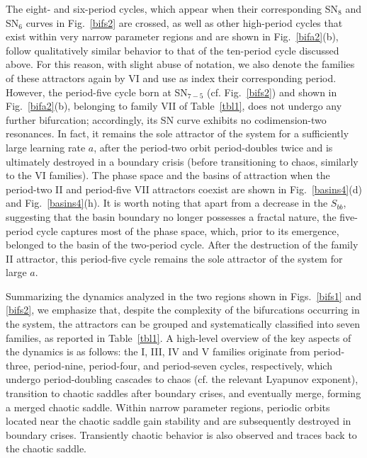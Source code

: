 \documentclass{article}
\theoremstyle{plain}
\theoremstyle{definition}
\begin{document}
The eight- and six-period cycles, which appear when their corresponding SN$_8$ and SN$_6$ curves in Fig.~\ref{bifs2} are crossed, as well as other high-period cycles that exist within very narrow parameter regions and are shown in Fig.~\ref{bifa2}(b), follow qualitatively similar behavior to that of the ten-period cycle discussed above. For this reason, with slight abuse of notation, we also denote the families of these attractors again by VI and use as index their corresponding period. However, the period-five cycle born at SN$_{7-5}$ (cf. Fig.~\ref{bifs2}) and shown in Fig.~\ref{bifa2}(b), belonging to family VII of Table~\ref{tbl1}, does not undergo any further bifurcation; accordingly, its SN curve exhibits no codimension-two resonances. In fact, it remains the sole attractor of the system for a sufficiently large learning rate $a$, after the period-two orbit period-doubles twice and is ultimately destroyed in a boundary crisis (before transitioning to chaos, similarly to the VI families). The phase space and the basins of attraction when the period-two II and period-five VII attractors coexist are shown in Fig.~\ref{basins4}(d) and Fig.~\ref{basins4}(h). It is worth noting that apart from a decrease in the $S_{bb}$, suggesting that the basin boundary no longer possesses a fractal nature, the five-period cycle captures most of the phase space, which, prior to its emergence, belonged to the basin of the two-period cycle. After the destruction of the family II attractor, this period-five cycle remains the sole attractor of the system for large $a.$

Summarizing the dynamics analyzed in the two regions shown in Figs.~\ref{bifs1} and \ref{bifs2}, we emphasize that, despite the complexity of the bifurcations occurring in the system, the attractors can be grouped and systematically classified into seven families, as reported in Table~\ref{tbl1}. A high-level overview of the key aspects of the dynamics is as follows: the I, III, IV and V families originate from period-three, period-nine, period-four, and period-seven cycles, respectively, which undergo period-doubling cascades to chaos (cf. the relevant Lyapunov exponent), transition to chaotic saddles after boundary crises, and eventually merge, forming a merged chaotic saddle. Within narrow parameter regions, periodic orbits located near the chaotic saddle gain stability and are subsequently destroyed in boundary crises. Transiently chaotic behavior is also observed and traces back to the chaotic saddle.
\end{document}
